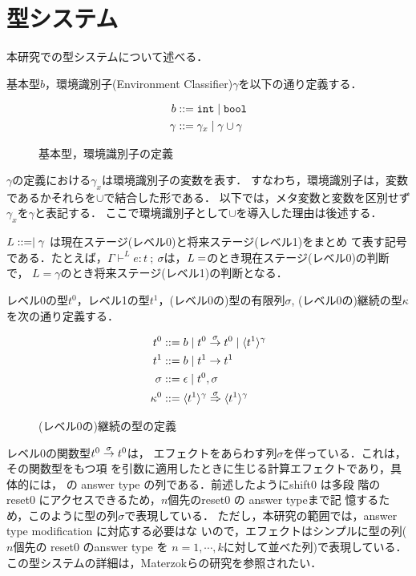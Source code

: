 \chapter{型システム}

本研究での型システムについて述べる．

基本型$b$，環境識別子(Environment Classifier)$\gamma$を以下の通り定義する．

\begin{figure}[H]
  \centering
  \begin{align*}
    b & ::= \mbox{\texttt{int}} \mid \mbox{\texttt{bool}} \\
    \gamma & ::= \gamma_x \mid \gamma \cup \gamma
  \end{align*}
  \caption{基本型，環境識別子の定義}
  \label{fig:bec_def}
\end{figure}

$\gamma$の定義における$\gamma_x$は環境識別子の変数を表す．
すなわち，環境識別子は，変数であるかそれらを$\cup$で結合した形である．
以下では，メタ変数と変数を区別せず$\gamma_x$を$\gamma$と表記する．
ここで環境識別子として$\cup$を導入した理由は後述する．

$L ::= \empty \mid \gamma$ は現在ステージ(レベル0)と将来ステージ(レベル1)をまとめ
て表す記号である．たとえば，$\Gamma \vdash^L
e:t~;~\sigma$は，$L=\empty$のとき現在ステージ(レベル0)の判断で，
$L=\gamma$のとき将来ステージ(レベル1)の判断となる．

レベル0の型$t^0$，レベル1の型$t^1$，(レベル0の)型の有限列$\sigma$,
(レベル0の)継続の型$\kappa$を次の通り定義する．

\begin{figure}[H]
  \centering
  \begin{align*}
    t^0 & ::= b \mid {t^0} \stackrel{\sigma}{\rightarrow} {t^0} \mid \langle{t^1}\rangle^{\gamma} \\
    t^1 & ::= b \mid t^1 \to t^1 \\
    \sigma & ::= \epsilon \mid t^0, \sigma \\
    \kappa^0 & ::= {\langle{t^1}\rangle^{\gamma}} \stackrel{\sigma}{\Rightarrow} {\langle{t^1}\rangle^{\gamma}}
  \end{align*}
  \caption{(レベル0の)継続の型の定義}
  \label{fig:k_def}
\end{figure}

レベル0の関数型${t^0} \stackrel{\sigma}{\rightarrow} {t^0}$は，
エフェクトをあらわす列$\sigma$を伴っている．これは，その関数型をもつ項
を引数に適用したときに生じる計算エフェクトであり，具体的には，
\Shiftz の answer type の列である．前述したようにshift0 は多段
階の reset0 にアクセスできるため，$n$個先のreset0 の answer typeまで記
憶するため，このように型の列$\sigma$で表現している．
ただし，本研究の範囲では，answer type modification に対応する必要はな
いので，エフェクトはシンプルに型の列($n$個先の reset0 のanswer type を
$n=1,\cdots,k$に対して並べた列)で表現している．
この型システムの詳細は，Materzokら\cite{Materzok2011}の研究を参照されたい．

